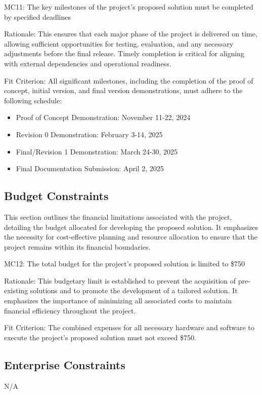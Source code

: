 \documentclass[12pt]{article}
\begin{document}
\indent
MC11: The key milestones of the project's proposed solution must be completed by specified deadlines

Rationale: This ensures that each major phase of the project is delivered on time, allowing sufficient opportunities for testing, evaluation, and any necessary adjustments before the final release. Timely completion is critical for aligning with external dependencies and operational readiness.

Fit Criterion: All significant milestones, including the completion of the proof of concept, initial version, and final version demonstrations, must adhere to the following schedule:
\begin{itemize}
    \item Proof of Concept Demonstration: November 11-22, 2024
    \item Revision 0 Demonstration: February 3-14, 2025
    \item Final/Revision 1 Demonstration: March 24-30, 2025
    \item Final Documentation Submission: April 2, 2025
\end{itemize}

\subsection{Budget Constraints}
This section outlines the financial limitations associated with the project, detailing the budget allocated for developing the proposed solution. It emphasizes the necessity for cost-effective planning and resource allocation to ensure that the project remains within its financial boundaries.

\indent
MC12: The total budget for the project's proposed solution is limited to \$750

Rationale: This budgetary limit is established to prevent the acquisition of pre-existing solutions and to promote the development of a tailored solution. It emphasizes the importance of minimizing all associated costs to maintain financial efficiency throughout the project.

Fit Criterion: The combined expenses for all necessary hardware and software to execute the project's proposed solution must not exceed \$750.

\subsection{Enterprise Constraints}
N/A
\end{document}

